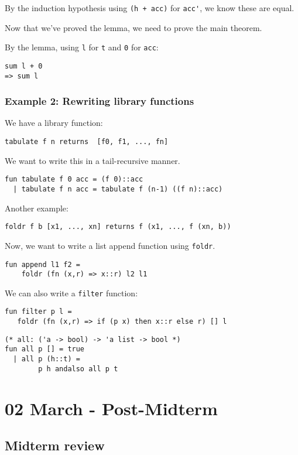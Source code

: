 \documentclass[11pt]{article}
\begin{document}
By the induction hypothesis using \verb~(h + acc)~ for \verb~acc'~, we know these are equal.

Now that we've proved the lemma, we need to prove the main theorem.

By the lemma, using \verb~l~ for \verb~t~ and \verb~0~ for \verb~acc~:
\begin{verbatim}
sum l + 0
=> sum l
\end{verbatim}

\subsubsection{Example 2: Rewriting library functions}

We have a library function:
\begin{verbatim}
tabulate f n returns  [f0, f1, ..., fn]
\end{verbatim}

We want to write this in a tail-recursive manner.
\begin{verbatim}
fun tabulate f 0 acc = (f 0)::acc
  | tabulate f n acc = tabulate f (n-1) ((f n)::acc)
\end{verbatim}

Another example:
\begin{verbatim}
foldr f b [x1, ..., xn] returns f (x1, ..., f (xn, b))
\end{verbatim}

Now, we want to write a list append function using \verb~foldr~.
\begin{verbatim}
fun append l1 f2 = 
    foldr (fn (x,r) => x::r) l2 l1
\end{verbatim}

We can also write a \verb~filter~ function:
\begin{verbatim}
fun filter p l =
   foldr (fn (x,r) => if (p x) then x::r else r) [] l
\end{verbatim}

\begin{verbatim}
(* all: ('a -> bool) -> 'a list -> bool *)
fun all p [] = true
  | all p (h::t) = 
        p h andalso all p t
\end{verbatim}

\section{02 March - Post-Midterm}
\subsection{Midterm review}
\end{document}
